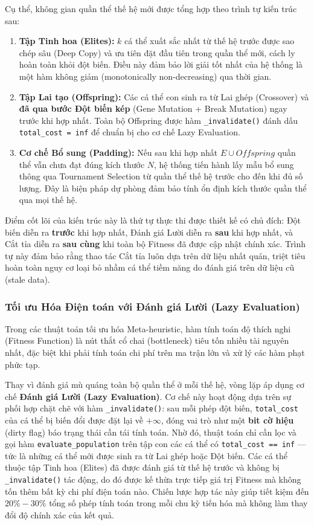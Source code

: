 \documentclass[12pt,a4paper]{article}
\numberwithin{figure}{subsection}
\begin{document}
Cụ thể, không gian quần thể thế hệ mới được tổng hợp theo trình tự kiến trúc sau:
\begin{enumerate}
    \item \textbf{Tập Tinh hoa (Elites):} $k$ cá thể xuất sắc nhất từ thế hệ trước được sao chép sâu (Deep Copy) và ưu tiên đặt đầu tiên trong quần thể mới, cách ly hoàn toàn khỏi đột biến. Điều này đảm bảo lời giải tốt nhất của hệ thống là một hàm không giảm (monotonically non-decreasing) qua thời gian.
    \item \textbf{Tập Lai tạo (Offspring):} Các cá thể con sinh ra từ Lai ghép (Crossover) và \textbf{đã qua bước Đột biến kép} (Gene Mutation + Break Mutation) ngay trước khi hợp nhất. Toàn bộ Offspring được hàm \texttt{\_invalidate()} đánh dấu \texttt{total\_cost = inf} để chuẩn bị cho cơ chế Lazy Evaluation.
    \item \textbf{Cơ chế Bổ sung (Padding):} Nếu sau khi hợp nhất $E \cup Offspring$ quần thể vẫn chưa đạt đúng kích thước $N$, hệ thống tiến hành lấy mẫu bổ sung thông qua Tournament Selection từ quần thể thế hệ trước cho đến khi đủ số lượng. Đây là biện pháp dự phòng đảm bảo tính ổn định kích thước quần thể qua mọi thế hệ.
\end{enumerate}

Điểm cốt lõi của kiến trúc này là thứ tự thực thi được thiết kế có chủ đích: Đột biến diễn ra \textbf{trước} khi hợp nhất, Đánh giá Lười diễn ra \textbf{sau} khi hợp nhất, và Cắt tỉa diễn ra \textbf{sau cùng} khi toàn bộ Fitness đã được cập nhật chính xác. Trình tự này đảm bảo rằng thao tác Cắt tỉa luôn dựa trên dữ liệu nhất quán, triệt tiêu hoàn toàn nguy cơ loại bỏ nhầm cá thể tiềm năng do đánh giá trên dữ liệu cũ (stale data).

\subsubsection{Tối ưu Hóa Điện toán với Đánh giá Lười (Lazy Evaluation)}

Trong các thuật toán tối ưu hóa Meta-heuristic, hàm tính toán độ thích nghi (Fitness Function) là nút thắt cổ chai (bottleneck) tiêu tốn nhiều tài nguyên nhất, đặc biệt khi phải tính toán chi phí trên ma trận lớn và xử lý các hàm phạt phức tạp. 

Thay vì đánh giá mù quáng toàn bộ quần thể ở mỗi thế hệ, vòng lặp áp dụng cơ chế \textbf{Đánh giá Lười (Lazy Evaluation)}. Cơ chế này hoạt động dựa trên sự phối hợp chặt chẽ với hàm \texttt{\_invalidate()}: sau mỗi phép đột biến, \texttt{total\_cost} của cá thể bị biến đổi được đặt lại về $+\infty$, đóng vai trò như một \textbf{bit cờ hiệu} (dirty flag) báo trạng thái cần tái tính toán. Nhờ đó, thuật toán chỉ cần lọc và gọi hàm \texttt{evaluate\_population} trên tập con các cá thể có \texttt{total\_cost == inf} — tức là những cá thể mới được sinh ra từ Lai ghép hoặc Đột biến. Các cá thể thuộc tập Tinh hoa (Elites) đã được đánh giá từ thế hệ trước và không bị \texttt{\_invalidate()} tác động, do đó được kế thừa trực tiếp giá trị Fitness mà không tốn thêm bất kỳ chi phí điện toán nào. Chiến lược hợp tác này giúp tiết kiệm đến $20\%-30\%$ tổng số phép tính toán trong mỗi chu kỳ tiến hóa mà không làm thay đổi độ chính xác của kết quả.
\end{document}
